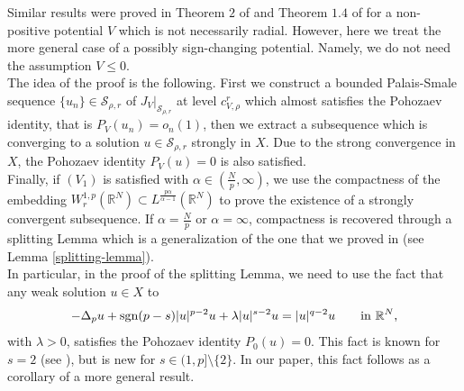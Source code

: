 \documentclass[11pt,reqno]{amsart}
\theoremstyle{definition}
\numberwithin{equation}{section}
\numberwithin{theorem}{section}
\numberwithin{equation}{section}
\numberwithin{theorem}{section}
\newcommand{\R}{\mathbb{R}}
\begin{document}
Similar results were proved in Theorem $2$ of \cite{dhara2025normalised} and Theorem $1.4$ of \cite{PR} for a non-positive potential $V$ which is not necessarily radial. However, here we treat the more general case of a possibly sign-changing potential. Namely, we do not need the assumption $V\le 0$.\\

The idea of the proof is the following. First we construct a bounded Palais-Smale sequence $\{u_n\}\in \mathcal{S}_{\rho,r}$ of $J_V|_{\mathcal{S}_{\rho,r}}$ at level $c^r_{V,\rho}$ which almost satisfies the Pohozaev identity, that is $P_V(u_n)=o_n(1)$, then we extract a subsequence which is converging to a solution $u\in \mathcal{S}_{\rho,r}$ strongly in $X$. Due to the strong convergence in $X$, the Pohozaev identity $P_V(u)=0$ is also satisfied.\\

Finally, if $(V_1)$ is satisfied with $\alpha\in(\frac{N}{p},\infty)$, we use the compactness of the embedding $W^{1,p}_r(\R^N)\subset L^\frac{p\alpha}{\alpha-1}(\R^N)$ to prove the existence of a strongly convergent subsequence. If $\alpha=\frac{N}{p}$ or $\alpha=\infty$, compactness is recovered through a splitting Lemma which is a generalization of the one that we proved in \cite{dhara2025normalised} (see Lemma \ref{splitting-lemma}).\\

In particular, in the proof of the splitting Lemma, we need to use the fact that any weak solution $u\in X$ to 
\begin{equation}\label{lim-eq}
-\Delta_p u+{\rm sgn}(p-s)|u|^{p-2}u+\lambda |u|^{s-2}u=|u|^{q-2}u\qquad\text{in $\R^N$,}   
\end{equation}
with $\lambda>0$, satisfies the Pohozaev identity $P_0(u)=0$. This fact is known for $s=2$ (see \cite{wang2021normalized,guedda1989quasilinear}), but is new for $s\in(1,p]\setminus\{2\}$. In our paper, this fact follows as a corollary of a more general result.\\ 
\end{document}
